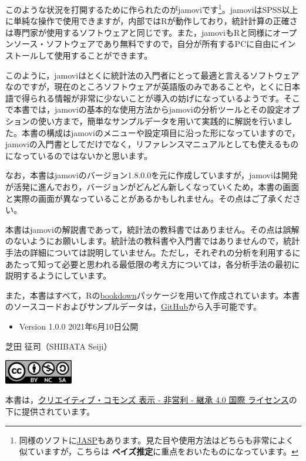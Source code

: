 \documentclass[
  12pt,
  a5jpaper,
  lualatex, ja=standard]{bxjsbook}
\providecommand{\tightlist}{%
  \setlength{\itemsep}{0pt}\setlength{\parskip}{0pt}}
\renewcommand{\emph}[1]{\textbf{\color{emph} #1}}
\begin{document}
このような状況を打開するために作られたのがjamoviです\footnote{同様のソフトに\href{https://jasp-stats.org/}{JASP}もあります。見た目や使用方法はどちらも非常によく似ていますが，こちらは\emph{ベイズ推定}に重点をおいたものになっています。}。jamoviはSPSS以上に単純な操作で使用できますが，内部ではRが動作しており，統計計算の正確さは専門家が使用するソフトウェアと同じです。また，jamoviもRと同様にオープンソース・ソフトウェアであり無料ですので，自分が所有するPCに自由にインストールして使用することができます。

このように，jamoviはとくに統計法の入門者にとって最適と言えるソフトウェアなのですが，現在のところソフトウェアが英語版のみであることや，とくに日本語で得られる情報が非常に少ないことが導入の妨げになっているようです。そこで本書では，jamoviの基本的な使用方法からjamoviの分析ツールとその設定オプションの使い方まで，簡単なサンプルデータを用いて実践的に解説を行いました。本書の構成はjamoviのメニューや設定項目に沿った形になっていますので，jamoviの入門書としてだけでなく，リファレンスマニュアルとしても使えるものになっているのではないかと思います。

なお，本書はjamoviのバージョン1.8.0.0を元に作成していますが，jamoviは開発が活発に進んでおり，バージョンがどんどん新しくなっていくため，本書の画面と実際の画面が異なっていることがあるかもしれません。その点はご了承ください。

本書はjamoviの解説書であって，統計法の教科書ではありません。その点は誤解のないようにお願いします。統計法の教科書や入門書ではありませんので，統計手法の詳細については説明していません。ただし，それぞれの分析を利用するにあたって知って必要と思われる最低限の考え方については，各分析手法の最初に説明するようにしています。

また，本書はすべて，Rの\href{https://bookdown.org/}{bookdown}パッケージを用いて作成されています。本書のソースコードおよびサンプルデータは，\href{https://github.com/sbtseiji/jmv_compguide.git}{GitHub}から入手可能です。

\begin{itemize}
\tightlist
\item
  Version 1.0.0 2021年6月10日公開
\end{itemize}

\vspace{2\zh}
\hfill 芝田 征司（SHIBATA Seiji）

\vfill
\begin{center}
\includegraphics[width=3cm]{images/CC-BY-NC-SA}
\end{center}
本書は，\href{http://creativecommons.org/licenses/by-nc-sa/4.0/}{クリエイティブ・コモンズ 表示 - 非営利 - 継承 4.0 国際 ライセンス}の下に提供されています。
\end{document}
